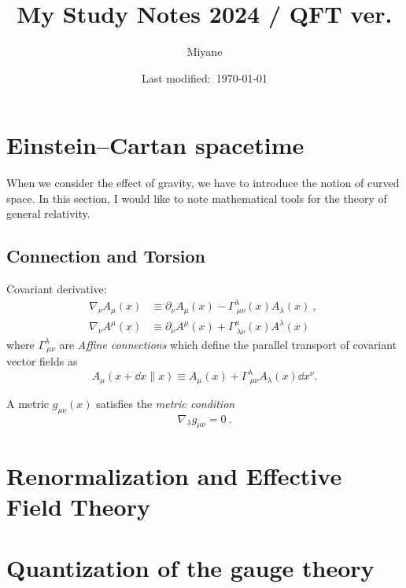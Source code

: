 \documentclass[a4paper,pdftex]{article}
\title{My Study Notes 2024 / QFT ver.}
\author{Miyane}
\date{Last modified:\ \today}
\begin{document}
\maketitle

\tableofcontents

\clearpage

\section{Einstein–Cartan spacetime}

When we consider the effect of gravity, we have to introduce the notion of curved space. In this section, I would like to note mathematical tools for the theory of general relativity.

\subsection{Connection and  Torsion}

Covariant derivative:
\begin{align}
  \nabla_{\nu}A_{\mu}(x)
  &\equiv
  \partial_{\nu}A_{\mu}(x)
  -
  \Gamma^{\lambda}_{\ \mu\nu}(x)A_{\lambda}(x)
  \ ,\ 
  \\
  \nabla_{\nu}A^{\mu}(x)
  &\equiv
  \partial_{\nu}A^{\mu}(x)
  +
  \Gamma^{\mu}_{\ \lambda\nu}(x)A^{\lambda}(x)
\end{align}
where $\Gamma^{\lambda}_{\ \mu\nu}$ are \textit{Affine connections} which define the parallel transport of covariant vector fields as
\begin{equation}
  A_{\mu}(x+\dd x \parallel x)
  \equiv
  A_{\mu}(x)
  +
  \Gamma^{\lambda}_{\ \mu\nu}A_{\lambda}(x)\dd x^{\nu}
  .
\end{equation}

A metric $g_{\mu\nu}(x)$ satisfies the \textit{metric condition}
\begin{equation}
  \nabla_{\lambda}g_{\mu\nu}
  =
  0
  \ .
\end{equation}





\clearpage
\section{Renormalization and Effective Field Theory}






\clearpage
\section{Quantization of the gauge theory}
\end{document}
